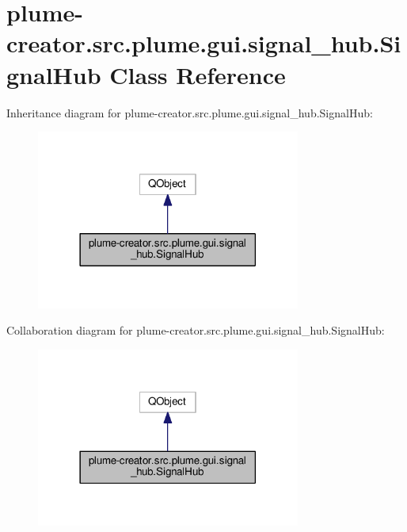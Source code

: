 \hypertarget{classplume-creator_1_1src_1_1plume_1_1gui_1_1signal__hub_1_1_signal_hub}{}\section{plume-\/creator.src.\+plume.\+gui.\+signal\+\_\+hub.\+Signal\+Hub Class Reference}
\label{classplume-creator_1_1src_1_1plume_1_1gui_1_1signal__hub_1_1_signal_hub}


Inheritance diagram for plume-\/creator.src.\+plume.\+gui.\+signal\+\_\+hub.\+Signal\+Hub\+:\nopagebreak
\begin{figure}[H]
\begin{center}
\leavevmode
\includegraphics[width=246pt]{classplume-creator_1_1src_1_1plume_1_1gui_1_1signal__hub_1_1_signal_hub__inherit__graph}
\end{center}
\end{figure}


Collaboration diagram for plume-\/creator.src.\+plume.\+gui.\+signal\+\_\+hub.\+Signal\+Hub\+:\nopagebreak
\begin{figure}[H]
\begin{center}
\leavevmode
\includegraphics[width=246pt]{classplume-creator_1_1src_1_1plume_1_1gui_1_1signal__hub_1_1_signal_hub__coll__graph}
\end{center}
\end{figure}

